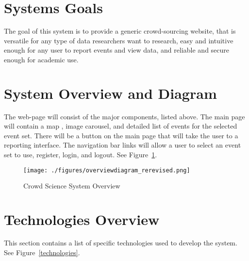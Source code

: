 \section{Systems Goals}
The goal of this system is to provide a generic crowd-sourcing website, that is versatile for any type of data researchers want to research, easy and intuitive enough for any user to report events and view data, and reliable and secure enough for academic use.

\section{System Overview and Diagram}
The web-page will consist of the major components, listed above. The main page will contain a map , image carousel, and detailed list of events for the selected event set. There will be a button on the main page that will take the user to a reporting interface. The navigation bar links will allow a user to select an event set to use, register, login, and logout. See Figure~\ref{overviewdesign}.

\begin{figure}[tbhp!]
\begin{center}
\texttt{[image: ./figures/overviewdiagram\_rerevised.png]}
\end{center}
\caption{Crowd Science System Overview\label{overviewdesign}}
\end{figure}

\section{Technologies Overview}
This section contains a list of specific technologies used to develop the system.  See Figure~\ref{technologies}.  

